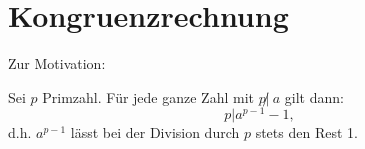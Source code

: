 \section{Kongruenzrechnung}
\label{sec:para3}
	Zur Motivation:
	
\begin{satz} \label{satz_3.1}
	Sei $p$ Primzahl. Für jede ganze Zahl mit $p \not | \ a$ gilt dann:
	\[ p | a^{p-1} - 1, \]
	d.h. $a^{p-1}$ lässt bei der Division durch $p$ stets den Rest 1. 
\end{satz}
\newpage